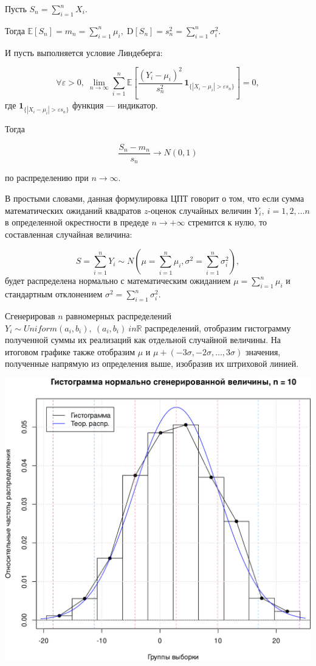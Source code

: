 \documentclass[
]{article}
\begin{document}
Пусть \(S_{n}=\sum \limits _{i=1}^{n}X_{i}\).

Тогда
\({\mathbb {E}}[S_{n}]=m_{n}=\sum \limits_{{i=1}}^{n}\mu_{i},\;{\mathrm {D}}[S_{n}]=s_{n}^{2}=\sum \limits_{{i=1}}^{n}\sigma _{i}^{2}\).

И пусть выполняется условие Линдеберга:

\[
\forall \varepsilon >0,\;\lim \limits _{{n\to \infty }}\sum \limits _{{i=1}}^{n}{\mathbb {E}}\left[{\frac {(Y_{i}-\mu _{i})^{2}}{s_{n}^{2}}}\,{\mathbf {1}}_{{\{|X_{i}-\mu _{i}|>\varepsilon s_{n}\}}}\right]=0,
\] где \({\mathbf {1}}_{{\{|X_{i}-\mu _{i}|>\varepsilon s_{n}\}}}\)
функция --- индикатор.

Тогда

\[
{\frac {S_{n}-m_{n}}{s_{n}}}\to N(0,1)
\]

по распределению при \(n\to \infty\).

В простыми словами, данная формулировка ЦПТ говорит о том, что если
сумма математических ожиданий квадратов \(z\)-оценок случайных величин
\(Y_i, \ i=1,2,\dots n\) в определенной окрестности в предеде
\(n \to +\infty\) стремится к нулю, то составленная случайная величина:

\[
S = \sum_{i=1}^{n} Y_i \sim N\left(\mu =\sum_{i=1}^n \mu_i, \sigma^2 = \sum_{i=1}^{n} \sigma_i^2\right),
\] будет распределена нормально с математическим ожиданием
\(\mu = \sum_{i=1}^n \mu_i\) и стандартным отклонением
\(\sigma^2 = \sum_{i=1}^{n} \sigma_i^2\).

Сгенерировав \(n\) равномерных распределений
\(Y_i \sim Uniform(a_i, b_i), \ (a_i, b_i) \ in \mathbb{R}\)
распределений, отобразим гистограмму полученной суммы их реализаций как
отдельной случайной величины. На итоговом графике также отобразим
\(\mu\) и \(\mu + (-3\sigma, -2\sigma, \dots, 3\sigma)\) значения,
полученные напрямую из определения выше, изобразив их штриховой линией.

\begin{center}\includegraphics[width=0.6\linewidth]{Prac4_files/figure-latex/unnamed-chunk-3-1} \end{center}
\end{document}
